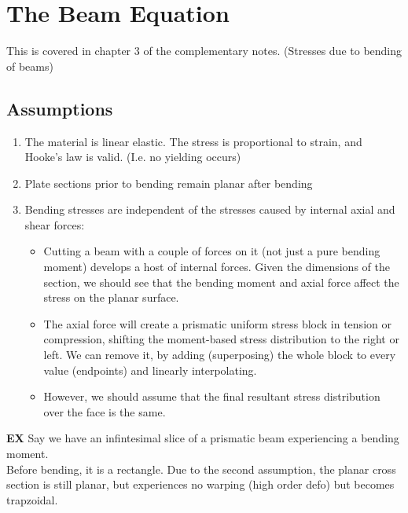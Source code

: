 \documentclass[10pt, twocolumn]{report}
\begin{document}
   \section{The Beam Equation}
   This is covered in chapter 3 of the complementary notes. (Stresses due to bending of beams)

   \subsection{Assumptions}
   \begin{enumerate}
     \item The material is linear elastic. The stress is proportional to strain, and Hooke's law is valid. (I.e. no yielding occurs)
     \item Plate sections prior to bending remain planar after bending
     \item Bending stresses are independent of the stresses caused by internal axial and shear forces:
     \begin{itemize}
       \item Cutting a beam with a couple of forces on it (not just a pure bending moment) develops a host of internal forces. Given the dimensions of the section, we should see that the bending moment and axial force affect the stress on the planar surface.
       \item The axial force will create a prismatic uniform stress block in tension or compression, shifting the moment-based stress distribution to the right or left. We can remove it, by adding (superposing) the whole block to every value (endpoints) and linearly interpolating.
       \item However, we should assume that the final resultant stress distribution over the face is the same.
     \end{itemize}
   \end{enumerate}

\textbf{EX} Say we have an infintesimal slice of a prismatic beam experiencing a bending moment.  \\Before bending, it is a rectangle. Due to the second assumption, the planar cross section is still planar, but experiences no warping (high order defo) but becomes trapzoidal. \\\\
\end{document}
